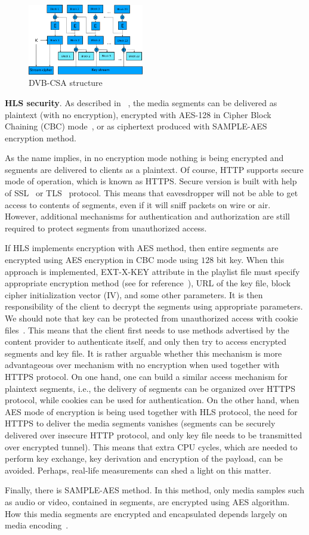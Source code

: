 \begin{figure}[ht]
\includegraphics[width=0.45\textwidth]{graphics/csa_arch.png}
\caption{DVB-CSA structure}
\label{fig:dvbcsa}
\end{figure}

{\bf HLS security}. As described in ~\cite{rfc8216}, the media segments
can be delivered as plaintext (with no encryption), encrypted with AES-128 
in Cipher Block Chaining (CBC) mode~\cite{Stinson:Cryptography}, or as ciphertext
produced with SAMPLE-AES encryption method. 

As the name implies, in no encryption mode nothing is being encrypted and
segments are delivered to clients as a plaintext. Of course,
HTTP supports secure mode of operation, which is known as HTTPS. 
Secure version is built with help of SSL~\cite{rfc6101} or TLS~\cite{rfc5246} protocol. 
This means that eavesdropper will not be able to get access to contents of 
segments, even if it will sniff packets on wire or air. 
However, additional mechanisms for authentication and authorization 
are still required to protect segments from unauthorized access.

If HLS implements encryption with AES method, then entire segments are encrypted 
using AES encryption in CBC mode using $128$ bit key. When this approach is implemented, 
EXT-X-KEY attribute in the playlist file must specify 
appropriate encryption method (see for reference~\cite{rfc8216}), URL 
of the key file, block cipher initialization vector (IV),
and some other parameters. It is then responsibility of the client 
to decrypt the segments using appropriate parameters.
We should note that key can be protected from unauthorized access with cookie 
files~\cite{httpcookie}. This means that the client first needs to use methods advertised 
by the content provider to authenticate itself, and only then try to access encrypted 
segments and key file. It is rather arguable whether this mechanism is more  
advantageous over mechanism with no encryption when used together with HTTPS protocol. 
On one hand, one can build a similar access mechanism for plaintext segments, 
i.e., the delivery of segments can be organized over HTTPS protocol, while cookies
can be used for authentication. On the other hand, when AES mode of encryption is being used together with 
HLS protocol, the need for HTTPS to deliver the media segments vanishes (segments 
can be securely delivered over insecure HTTP protocol, and only key file needs to 
be transmitted over encrypted tunnel). This means that extra CPU cycles, which are
needed to perform key exchange, key derivation and encryption of the payload, 
can be avoided. Perhaps, real-life measurements can shed a light on this matter.

Finally, there is SAMPLE-AES method. In this method, only  
media samples such as audio or video, contained in segments, 
are encrypted using AES algorithm. How this media segments 
are encrypted and encapsulated depends largely on media 
encoding~\cite{rfc8216}.


